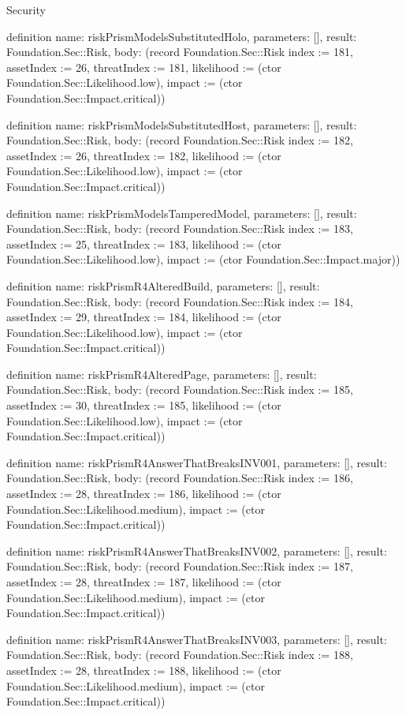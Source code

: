 \begin{lexlean}{Security}
\begin{semanticmodule}
definition{
  name: riskPrismModelsSubstitutedHolo,
  parameters: [],
  result: Foundation.Sec::Risk,
  body: (record Foundation.Sec::Risk {index := 181, assetIndex := 26, threatIndex := 181, likelihood := (ctor Foundation.Sec::Likelihood.low), impact := (ctor Foundation.Sec::Impact.critical)})
}

definition{
  name: riskPrismModelsSubstitutedHost,
  parameters: [],
  result: Foundation.Sec::Risk,
  body: (record Foundation.Sec::Risk {index := 182, assetIndex := 26, threatIndex := 182, likelihood := (ctor Foundation.Sec::Likelihood.low), impact := (ctor Foundation.Sec::Impact.critical)})
}

definition{
  name: riskPrismModelsTamperedModel,
  parameters: [],
  result: Foundation.Sec::Risk,
  body: (record Foundation.Sec::Risk {index := 183, assetIndex := 25, threatIndex := 183, likelihood := (ctor Foundation.Sec::Likelihood.low), impact := (ctor Foundation.Sec::Impact.major)})
}

definition{
  name: riskPrismR4AlteredBuild,
  parameters: [],
  result: Foundation.Sec::Risk,
  body: (record Foundation.Sec::Risk {index := 184, assetIndex := 29, threatIndex := 184, likelihood := (ctor Foundation.Sec::Likelihood.low), impact := (ctor Foundation.Sec::Impact.critical)})
}

definition{
  name: riskPrismR4AlteredPage,
  parameters: [],
  result: Foundation.Sec::Risk,
  body: (record Foundation.Sec::Risk {index := 185, assetIndex := 30, threatIndex := 185, likelihood := (ctor Foundation.Sec::Likelihood.low), impact := (ctor Foundation.Sec::Impact.critical)})
}

definition{
  name: riskPrismR4AnswerThatBreaksINV001,
  parameters: [],
  result: Foundation.Sec::Risk,
  body: (record Foundation.Sec::Risk {index := 186, assetIndex := 28, threatIndex := 186, likelihood := (ctor Foundation.Sec::Likelihood.medium), impact := (ctor Foundation.Sec::Impact.critical)})
}

definition{
  name: riskPrismR4AnswerThatBreaksINV002,
  parameters: [],
  result: Foundation.Sec::Risk,
  body: (record Foundation.Sec::Risk {index := 187, assetIndex := 28, threatIndex := 187, likelihood := (ctor Foundation.Sec::Likelihood.medium), impact := (ctor Foundation.Sec::Impact.critical)})
}

definition{
  name: riskPrismR4AnswerThatBreaksINV003,
  parameters: [],
  result: Foundation.Sec::Risk,
  body: (record Foundation.Sec::Risk {index := 188, assetIndex := 28, threatIndex := 188, likelihood := (ctor Foundation.Sec::Likelihood.medium), impact := (ctor Foundation.Sec::Impact.critical)})
}


\end{semanticmodule}
\end{lexlean}
